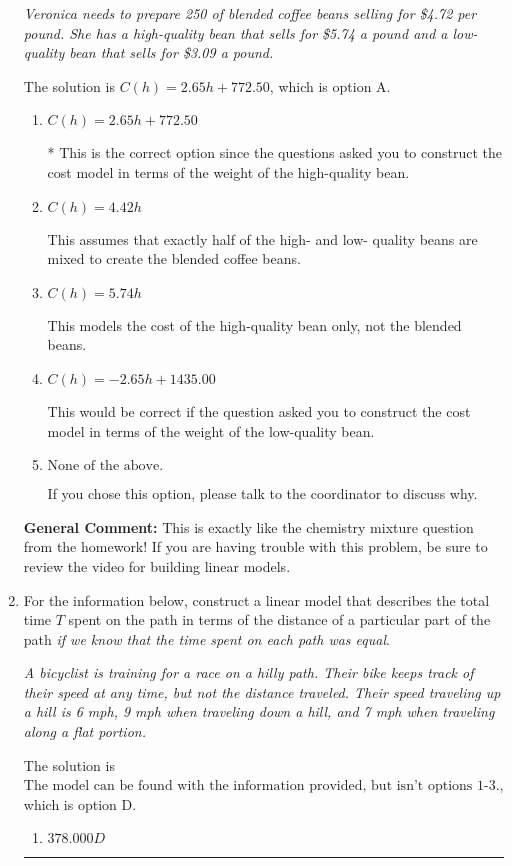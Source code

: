 \documentclass{extbook}[14pt]
\newcommand{\litem}[1]{\item #1

\rule{\textwidth}{0.4pt}}
\begin{document}
\begin{enumerate}
{\begin{center}
    \textit{ Veronica needs to prepare 250 of blended coffee beans selling for \$4.72 per pound. She has a high-quality bean that sells for \$5.74 a pound and a low-quality bean that sells for \$3.09 a pound. }
\end{center}
The solution is \( C(h) = 2.65 h + 772.50 \), which is option A.\begin{enumerate}[label=\Alph*.]
\item \( C(h) = 2.65 h + 772.50 \)

* This is the correct option since the questions asked you to construct the cost model in terms of the weight of the high-quality bean.
\item \( C(h) = 4.42 h \)

This assumes that exactly half of the high- and low- quality beans are mixed to create the blended coffee beans.
\item \( C(h) = 5.74 h \)

This models the cost of the high-quality bean only, not the blended beans.
\item \( C(h) = -2.65 h + 1435.00 \)

This would be correct if the question asked you to construct the cost model in terms of the weight of the low-quality bean.
\item \( \text{None of the above.} \)

If you chose this option, please talk to the coordinator to discuss why.
\end{enumerate}

\textbf{General Comment:} This is exactly like the chemistry mixture question from the homework! If you are having trouble with this problem, be sure to review the video for building linear models.
}
\litem{
For the information below, construct a linear model that describes the total time $T$ spent on the path in terms of the distance of a particular part of the path \textit{if we know that the time spent on each path was equal}.

\begin{center}
    \textit{ A bicyclist is training for a race on a hilly path. Their bike keeps track of their speed at any time, but not the distance traveled. Their speed traveling up a hill is 6 mph, 9 mph when traveling down a hill, and 7 mph when traveling along a flat portion. }
\end{center}
The solution is \( \text{The model can be found with the information provided, but isn't options 1-3.} \), which is option D.\begin{enumerate}[label=\Alph*.]
\item \( 378.000 D \)


\end{enumerate}}
\end{enumerate}
\end{document}
